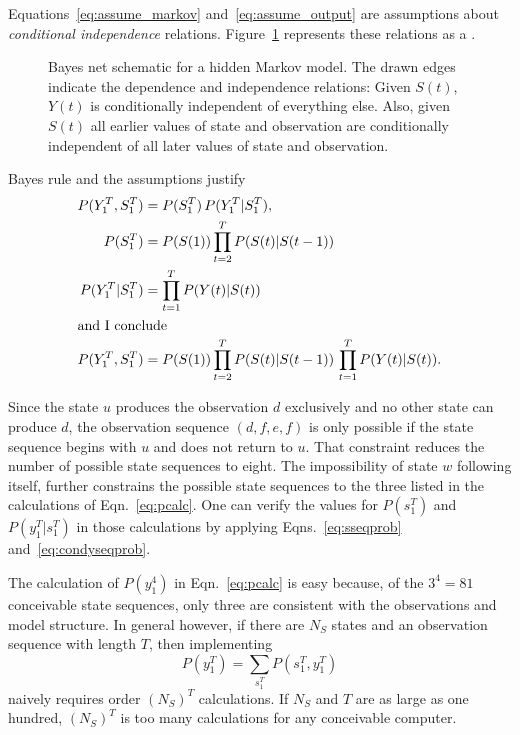 \documentclass[]{article}
\newcommand{\ts}[3]{#1_{#2}^{#3}}                    %
\newcommand{\ti}[2]{{#1}{(#2)}}                  %
\newcommand{\plotsize}{%
  \fontsize{9}{9}%
  \selectfont}
\renewcommand{\comment}[1]{}
\newcommand*{\inputfig}[2]{}
\newcommand*{\InputIntroductionFig}[1]{\inputfig{../figs/introduction}{#1}}
\begin{document}
Equations~\eqref{eq:assume_markov} and~\eqref{eq:assume_output} are
assumptions about \emph{conditional independence} relations.
Figure~\ref{fig:dhmm_net} represents these relations as a %
\emph{}.

\begin{figure}[htbp]
  \centering{\plotsize%
    \InputIntroductionFig{Markov_dhmm_net}
  }
  \caption[\comment{fig:dhmm-net }Bayes net schematic for a hidden Markov model.]%
  {Bayes net schematic for a hidden Markov model.  The drawn edges
    indicate the dependence and independence relations: Given
    $\ti{S}{t}$, $\ti{Y}{t}$ is conditionally independent of
    everything else.  Also, given $\ti{S}{t}$ all earlier values of
    state and observation are conditionally independent of all later
    values of state and observation.}\label{fig:dhmm_net}
\end{figure}

Bayes rule and the assumptions justify
\begin{align}
  P(\ts{Y}{1}{T},\ts{S}{1}{T}) &= P(\ts{S}{1}{T}) \, %
                                   P(\ts{Y}{1}{T}|\ts{S}{1}{T}),\notag\\
  \label{eq:sseqprob}%
  P(\ts{S}{1}{T})              &= P(\ti{S}{1}) %
                                   \prod_{t=2}^T P(\ti{S}{t}|\ti{S}{t-1})\\
  \label{eq:condyseqprob}%
  P(\ts{Y}{1}{T}|\ts{S}{1}{T}) &= \prod_{t=1}^T P(\ti{Y}{t}|\ti{S}{t})\\
  \intertext{and I conclude}
  P(\ts{Y}{1}{T},\ts{S}{1}{T}) &= P(\ti{S}{1}) %
                                   \prod_{t=2}^T P(\ti{S}{t}|\ti{S}{t-1})\, %
                                   \prod_{t=1}^T P(\ti{Y}{t}|\ti{S}{t}).\notag
\end{align}

Since the state $u$ produces the observation $d$ exclusively and no
other state can produce $d$, the observation sequence $(d,f,e,f)$ is
only possible if the state sequence begins with $u$ and does not
return to $u$.  That constraint reduces the number of possible state
sequences to eight.  The impossibility of state $w$ following itself,
further constrains the possible state sequences to the three listed in
the calculations of Eqn.~\eqref{eq:pcalc}.  One can verify the values
for $P(\ts{s}{1}{T})$ and $P(\ts{y}{1}{T}|\ts{s}{1}{T})$ in those
calculations by applying Eqns.~\eqref{eq:sseqprob}
and~\eqref{eq:condyseqprob}.

The calculation of $P(\ts{y}{1}{4})$ in Eqn.~\eqref{eq:pcalc} is easy
because, of the $3^4 = 81$ conceivable state sequences, only three are
consistent with the observations and model structure.  In general
however, if there are $N_S$ states and an observation sequence with
length $T$, then implementing
\begin{equation*}
  P(\ts{y}{1}{T}) = \sum_{\ts{s}{1}{T}} P\left(\ts{s}{1}{T}
    ,\ts{y}{1}{T} \right)
\end{equation*}
naively requires order ${\left(N_S\right)}^T$ calculations.  If $N_S$
and $T$ are as large as one hundred, ${\left(N_S\right)}^T$ is too
many calculations for any conceivable computer.
\end{document}
